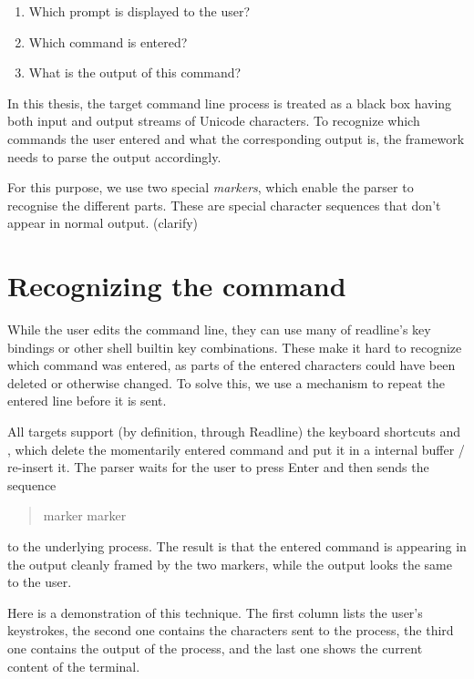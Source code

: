 \documentclass[twoside,blue]{tubsreprt}
\begin{document}
\begin{enumerate}
    \item Which prompt is displayed to the user?
    \item Which command is entered?
    \item What is the output of this command?
\end{enumerate}

In this thesis, the target command line process is treated as a black box having both input and output streams of Unicode characters. To recognize which commands the user entered and what the corresponding output is, the framework needs to parse the output accordingly.

For this purpose, we use two special \emph{markers}, which enable the parser to recognise the different parts. These are special character sequences that don't appear in normal output. (clarify)

\section{Recognizing the command}

While the user edits the command line, they can use many of readline's key bindings or other shell builtin key combinations. These make it hard to recognize which command was entered, as parts of the entered characters could have been deleted or otherwise changed. To solve this, we use a mechanism to repeat the entered line before it is sent.

All targets support (by definition, through Readline) the keyboard shortcuts  and , which delete the momentarily entered command and put it in a internal buffer / re-insert it. The parser waits for the user to press Enter and then sends the sequence

\begin{quote}
     marker \keys{\backspace}  marker \keys{\backspace} \keys{\return}
\end{quote}

to the underlying process. The result is that the entered command is appearing in the output cleanly framed by the two markers, while the output looks the same to the user.

Here is a demonstration of this technique. The first column lists the user's keystrokes, the second one contains the characters sent to the process, the third one contains the output of the process, and the last one shows the current content of the terminal.
\end{document}
